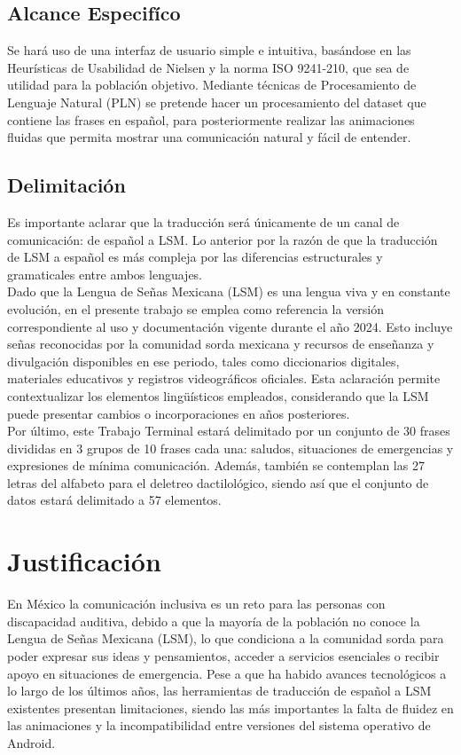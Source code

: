 \subsection{Alcance Especifíco}
Se hará uso de una interfaz de usuario simple e intuitiva, basándose en las Heurísticas de Usabilidad de Nielsen y la norma ISO 9241-210, que sea de utilidad para la población objetivo. Mediante técnicas de Procesamiento de Lenguaje Natural (PLN) se pretende hacer un procesamiento del dataset que contiene las frases en español, para posteriormente realizar las animaciones fluidas que permita mostrar una comunicación natural y fácil de entender.

\subsection{Delimitación}
Es importante aclarar que la traducción será únicamente de un canal de comunicación: de español a LSM. Lo anterior por la razón de que la traducción de LSM a español es más compleja por las diferencias estructurales y gramaticales entre ambos lenguajes.\\

Dado que la Lengua de Señas Mexicana (LSM) es una lengua viva y en constante evolución, en el presente trabajo se emplea como referencia la versión correspondiente al uso y documentación vigente durante el año 2024. Esto incluye señas reconocidas por la comunidad sorda mexicana y recursos de enseñanza y divulgación disponibles en ese periodo, tales como diccionarios digitales, materiales educativos y registros videográficos oficiales. Esta aclaración permite contextualizar los elementos lingüísticos empleados, considerando que la LSM puede presentar cambios o incorporaciones en años posteriores.\\

Por último, este Trabajo Terminal estará delimitado por un conjunto de 30 frases divididas en 3 grupos de 10 frases cada una: saludos, situaciones de emergencias y expresiones de mínima comunicación. Además, también se contemplan las 27 letras del alfabeto para el deletreo dactilológico, siendo así que el conjunto de datos estará delimitado a 57 elementos.

\newpage

\section{Justificación}
En México la comunicación inclusiva es un reto para las personas con discapacidad auditiva, debido a que la mayoría de la población no conoce la Lengua de Señas Mexicana (LSM), lo que condiciona a la comunidad sorda para poder expresar sus ideas y pensamientos, acceder a servicios esenciales o recibir apoyo en situaciones de emergencia. Pese a que ha habido avances tecnológicos a lo largo de los últimos años, las herramientas de traducción de español a LSM existentes presentan limitaciones, siendo las más importantes la falta de fluidez en las animaciones y la incompatibilidad entre versiones del sistema operativo de Android. \\

